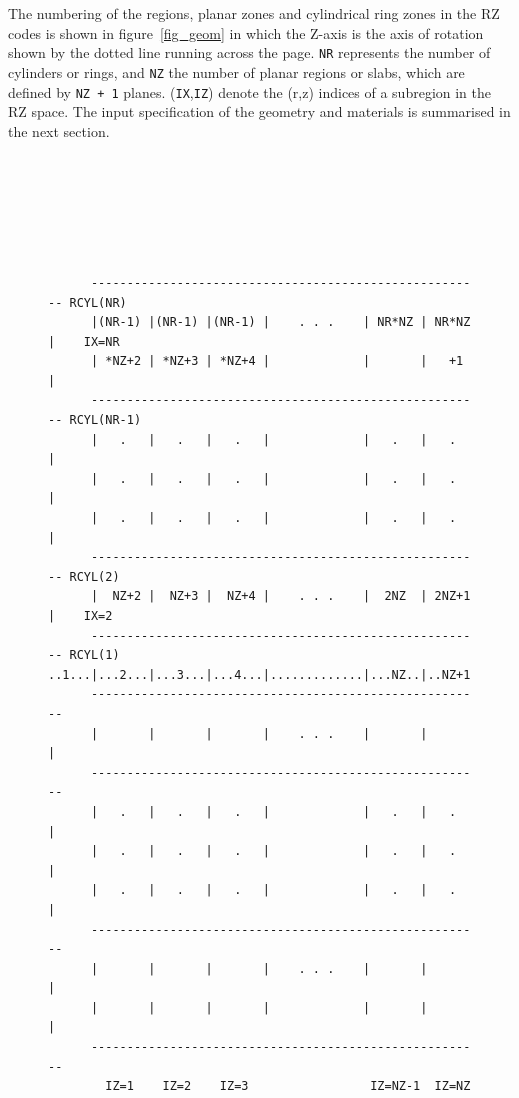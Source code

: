 \documentclass[12pt,twoside]{article}  %
\begin{document}
The numbering of the regions, planar zones and cylindrical
ring zones in the RZ codes is shown in figure~\ref{fig_geom} in which
the Z-axis is the axis of rotation shown by the dotted line running
across the page. \verb+NR+ represents the number of cylinders  or rings, and
\verb+NZ+ the number of planar regions or slabs, 
which are defined by {\tt NZ + 1}
planes.
(\verb+IX+,\verb+IZ+) denote the (r,z) indices of a subregion in the
RZ space.
The input specification of the geometry and materials is summarised 
in the next section.

\begin{figure}[htb]
    
\begin{center}

\begin{verbatim}






      ------------------------------------------------------- RCYL(NR)
      |(NR-1) |(NR-1) |(NR-1) |    . . .    | NR*NZ | NR*NZ |    IX=NR
      | *NZ+2 | *NZ+3 | *NZ+4 |             |       |   +1  |
      ------------------------------------------------------- RCYL(NR-1)
      |   .   |   .   |   .   |             |   .   |   .   |
      |   .   |   .   |   .   |             |   .   |   .   |
      |   .   |   .   |   .   |             |   .   |   .   |
      ------------------------------------------------------- RCYL(2)
      |  NZ+2 |  NZ+3 |  NZ+4 |    . . .    |  2NZ  | 2NZ+1 |    IX=2
      ------------------------------------------------------- RCYL(1)
..1...|...2...|...3...|...4...|.............|...NZ..|..NZ+1.|....IX=1..1..
      -------------------------------------------------------
      |       |       |       |    . . .    |       |       |
      -------------------------------------------------------
      |   .   |   .   |   .   |             |   .   |   .   |
      |   .   |   .   |   .   |             |   .   |   .   |
      |   .   |   .   |   .   |             |   .   |   .   |
      -------------------------------------------------------
      |       |       |       |    . . .    |       |       |
      |       |       |       |             |       |       |
      -------------------------------------------------------
        IZ=1    IZ=2    IZ=3                 IZ=NZ-1  IZ=NZ



\end{verbatim}
\end{center}
\end{figure}
\end{document}
